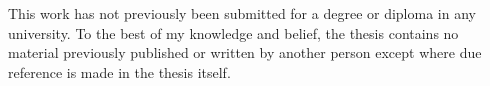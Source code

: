 
This work has not previously been submitted for a degree or diploma in any university.
To the best of my knowledge and belief, the thesis contains no material previously
published or written by another person except where due reference is made in the thesis
itself.\par
\vspace{3cm}
\Zia






